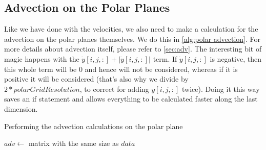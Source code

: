 \subsection{Advection on the Polar Planes}
Like we have done with the velocities, we also need to make a calculation for the advection on the polar planes themselves. We do this in \autoref{alg:polar advection}. For more details about 
advection itself, please refer to \autoref{sec:adv}. The interesting bit of magic happens with the $\dot{y}[i, j, :] + |\dot{y}[i, j, :]|$ term. If $\dot{y}[i, j, :]$ is negative, then this 
whole term will be $0$ and hence will not be considered, whereas if it is positive it will be considered (that's also why we divide by $2 * polarGridResolution$, to correct for adding 
$\dot{y}[i, j, :]$ twice). Doing it this way saves an if statement and allows everything to be calculated faster along the last dimension.

\begin{algorithm}[htb]
    \caption{Performing the advection calculations on the polar plane}
    \label{alg:polar advection}
    $adv \leftarrow $ matrix with the same size as $data$ \;
\end{algorithm}